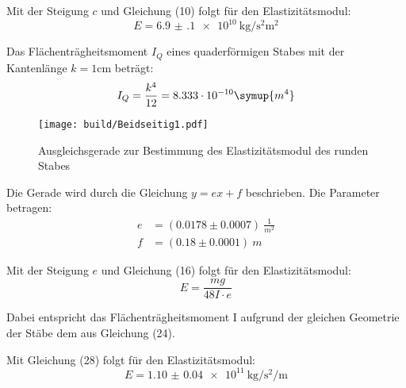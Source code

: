 Mit der Steigung $c$ und Gleichung (10) folgt für den Elastizitätsmodul:
\begin{equation}
  E = \SI{6.9(1)e10}{\kilo\gram\per\second\squared\square\meter}
\end{equation}

Das Flächenträgheitsmoment $I_Q$ eines quaderförmigen Stabes mit der Kantenlänge
$k = 1$cm beträgt:
\begin{equation}
  I_Q = \frac{k^4}{12} = 8.333 \cdot 10^{-10} \symup{m^4}
\end{equation}

\begin{figure}[H]
  \centering
  \texttt{[image: build/Beidseitig1.pdf]}
  \caption{Ausgleichsgerade zur Bestimmung des Elastizitätsmodul des runden Stabes}
  \label{fig:Elastizitätsmodul des runden Stabes}
\end{figure}

Die Gerade wird durch die Gleichung $y = ex + f$ beschrieben. Die Parameter betragen:
\begin{align*}
  e &= (0.0178 \pm 0.0007) \: \frac{1}{m^2} \\
  f &= (0.18  \pm 0.0001) \: m
\end{align*}

Mit der Steigung $e$ und Gleichung (16) folgt für den Elastizitätsmodul:
\begin{equation}
  E = \frac{mg}{48I \cdot e}
\end{equation}

Dabei entspricht das Flächenträgheitsmoment I aufgrund der gleichen Geometrie der Stäbe
dem aus Gleichung (24).

Mit Gleichung (28) folgt für den Elastizitätsmodul:
\begin{equation}
  E = \SI{1.10(4)e11}{\kilo\gram\per\second\squared\per\meter}
\end{equation}
